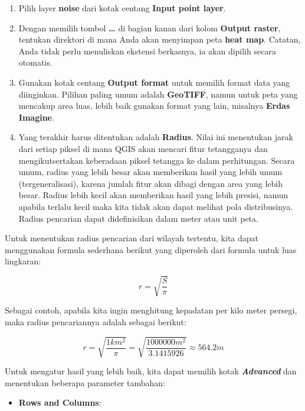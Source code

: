 \documentclass[]{book}
\providecommand{\tightlist}{%
  \setlength{\itemsep}{0pt}\setlength{\parskip}{0pt}}
\begin{document}
\begin{enumerate}
\def\labelenumi{\arabic{enumi}.}
\setcounter{enumi}{1}
\item
  Pilih layer \textbf{noise} dari kotak centang \textbf{Input point layer}.
\item
  Dengan memilih tombol \textbf{\ldots{}} di bagian kanan dari kolom \textbf{Output raster}, tentukan direktori di mana Anda akan menyimpan peta \textbf{heat map}. Catatan, Anda tidak perlu menuliskan ekstensi berkasnya, ia akan dipilih secara otomatis.
\item
  Gunakan kotak centang \textbf{Output format} untuk memilih format data yang diinginkan. Pilihan paling umum adalah \textbf{GeoTIFF}, namun untuk peta yang mencakup area luas, lebih baik gunakan format yang lain, misalnya \textbf{Erdas Imagine}.
\item
  Yang terakhir harus ditentukan adalah \textbf{Radius}. Nilai ini menentukan jarak dari setiap piksel di mana QGIS akan mencari fitur tetangganya dan mengikutsertakan keberadaan piksel tetangga ke dalam perhitungan. Secara umum, radius yang lebih besar akan memberikan hasil yang lebih umum (tergeneralisasi), karena jumlah fitur akan dibagi dengan area yang lebih besar. Radius lebih kecil akan memberikan hasil yang lebih presisi, namun apabila terlalu kecil maka kita tidak akan dapat melihat pola distribusinya. Radius pencarian dapat didefinisikan dalam meter atau unit peta.
\end{enumerate}

Untuk menentukan radius pencarian dari wilayah tertentu, kita dapat menggunakan formula sederhana berikut yang diperoleh dari formula untuk luas lingkaran:

\begin{equation*}
r = \sqrt{\frac{S}{\pi}}
\end{equation*}

Sebagai contoh, apabila kita ingin menghitung kepadatan per kilo meter persegi, maka radius pencariannya adalah sebagai berikut:

\begin{equation*}
r = \sqrt{\frac{1 km^2}{\pi}} = \sqrt{\frac{1000000 m^2}{3.1415926}} \approx 564.2 m
\end{equation*}

Untuk mengatur hasil yang lebih baik, kita dapat memilih kotak \textbf{\emph{Advanced}} dan menentukan beberapa parameter tambahan:

\begin{itemize}
\tightlist
\item
  \textbf{Rows and Columns}:
\end{itemize}
\end{document}
